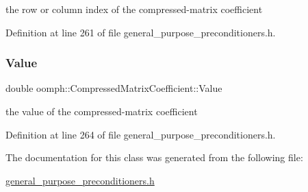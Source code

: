 the row or column index of the compressed-\/matrix coefficient 



Definition at line 261 of file general\+\_\+purpose\+\_\+preconditioners.\+h.

\mbox{\label{classoomph_1_1CompressedMatrixCoefficient_a8873cbcd41c135197f049bbcec71fa6b}} 
\subsubsection{\texorpdfstring{Value}{Value}}
{\footnotesize\ttfamily double oomph\+::\+Compressed\+Matrix\+Coefficient\+::\+Value\hspace{0.3cm}{\ttfamily [private]}}



the value of the compressed-\/matrix coefficient 



Definition at line 264 of file general\+\_\+purpose\+\_\+preconditioners.\+h.



The documentation for this class was generated from the following file\+:\begin{DoxyCompactItemize}
\item 
\hyperlink{general__purpose__preconditioners_8h}{general\+\_\+purpose\+\_\+preconditioners.\+h}\end{DoxyCompactItemize}
